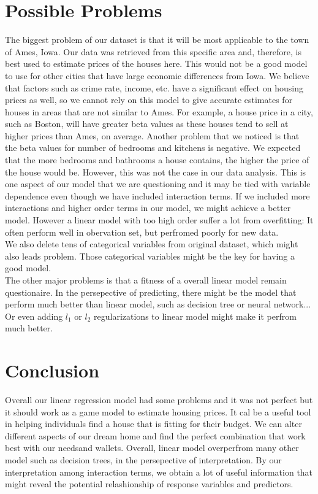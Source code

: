 \documentclass{article}
\begin{document}
\section*{Possible Problems}
The biggest problem of our dataset is that it will be most applicable to the town of Ames, Iowa. Our data was retrieved from this specific area and, therefore, is best used to estimate prices of the houses here. This would not be a good model to use for other cities that have large economic differences from Iowa. We believe that factors such as crime rate, income, etc. have a significant effect on housing prices as well, so we cannot rely on this model to give accurate estimates for houses in areas that are not similar to Ames. For example, a house price in a city, such as Boston, will have greater beta values as these houses tend to sell at higher prices than Ames, on average. Another problem that we noticed is that the beta values for number of bedrooms and kitchens is negative. We expected that the more bedrooms and bathrooms a house contains, the higher the price of the house would be. However, this was not the case in our data analysis. This is one aspect of our model that we are questioning and it may be tied with variable dependence even though we have included interaction terms. If we included more interactions and higher order terms in our model, we might achieve a better model. However a linear model with too high order suffer a lot from overfitting: It often perform well in obervation set, but perfromed poorly for new data.\\
We also delete tens of categorical variables from original dataset, which might also leads problem. Those categorical variables might be the key for having a good model.\\
The other major problems is that a fitness of a overall linear model remain questionaire. In the persepective of predicting, there might be the model that perform much better than linear model, such as decision tree or neural network... Or even adding $l_1$ or $l_2$ regularizations to linear model might make it perfrom much better. 

\section*{Conclusion}
Overall our linear regression model had some problems and it was not perfect but it should work as a game model to estimate housing prices. It cal be a useful tool in helping individuals find a house that is fitting for their budget. We can alter different aspects of our dream home and find the perfect combination that work best with our needsand wallets. Overall, linear model overperfrom many other model such as decision trees, in the persepective of interpretation. By our interpretation among interaction terms, we obtain a lot of useful information that might reveal the potential relashionship of response variables and predictors.
\end{document}
